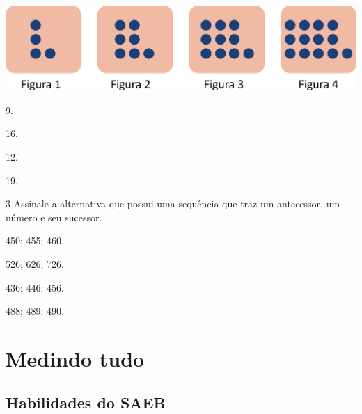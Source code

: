 \begin{center}
\includegraphics[width=.7\textwidth]{./media/image32.png}
\end{center}

\begin{escolha}

\begin{multicols}{2}

\item 9.

\item 16.
\end{multicols}


\begin{multicols}{2}

\item 12.

\item 19.
\end{multicols}
\end{escolha}

\num{3} Assinale a alternativa que possui uma sequência que traz um antecessor, um número e seu sucessor.

\begin{escolha}
\item 450; 455; 460.

\item 526; 626; 726.

\item 436; 446; 456.

\item 488; 489; 490.
\end{escolha}

\chapter{Medindo tudo}

\enlargethispage{3\baselineskip}

\section*{Habilidades do SAEB}


